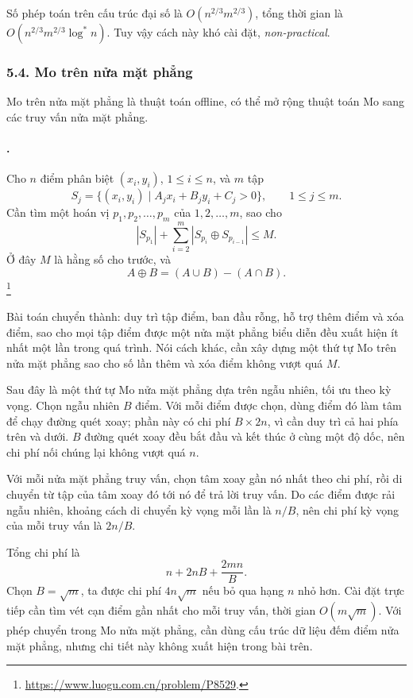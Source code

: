 \documentclass[11pt]{article}
\begin{document}
Số phép toán trên cấu trúc đại số là \(O(n^{2/3}m^{2/3})\), tổng thời gian là
\(O(n^{2/3}m^{2/3}\log^* n)\). Tuy vậy cách này khó cài đặt, \emph{non-practical}.

\subsubsection*{5.4. Mo trên nửa mặt phẳng}

Mo trên nửa mặt phẳng là thuật toán offline, có thể mở rộng thuật toán Mo sang
các truy vấn nửa mặt phẳng.

\paragraph{.}
Cho \(n\) điểm phân biệt \((x_i,y_i)\), \(1\le i\le n\), và \(m\) tập
\[
  S_j=\{(x_i,y_i)\mid A_jx_i+B_jy_i+C_j>0\},\qquad 1\le j\le m.
\]
Cần tìm một hoán vị \(p_1,p_2,\ldots,p_m\) của \(1,2,\ldots,m\), sao cho
\[
  |S_{p_1}|+\sum_{i=2}^{m}|S_{p_i}\oplus S_{p_{i-1}}|\le M.
\]
Ở đây \(M\) là hằng số cho trước, và
\[
  A\oplus B=(A\cup B)-(A\cap B).
\]
\footnote{\url{https://www.luogu.com.cn/problem/P8529}.}

Bài toán chuyển thành: duy trì tập điểm, ban đầu rỗng, hỗ trợ thêm điểm và xóa
điểm, sao cho mọi tập điểm được một nửa mặt phẳng biểu diễn đều xuất hiện ít
nhất một lần trong quá trình. Nói cách khác, cần xây dựng một thứ tự Mo trên
nửa mặt phẳng sao cho số lần thêm và xóa điểm không vượt quá \(M\).

Sau đây là một thứ tự Mo nửa mặt phẳng dựa trên ngẫu nhiên, tối ưu theo kỳ
vọng. Chọn ngẫu nhiên \(B\) điểm. Với mỗi điểm được chọn, dùng điểm đó làm tâm
để chạy đường quét xoay; phần này có chi phí \(B\times 2n\), vì cần duy trì cả
hai phía trên và dưới. \(B\) đường quét xoay đều bắt đầu và kết thúc ở cùng một
độ dốc, nên chi phí nối chúng lại không vượt quá \(n\).

Với mỗi nửa mặt phẳng truy vấn, chọn tâm xoay gần nó nhất theo chi phí, rồi di
chuyển từ tập của tâm xoay đó tới nó để trả lời truy vấn. Do các điểm được rải
ngẫu nhiên, khoảng cách di chuyển kỳ vọng mỗi lần là \(n/B\), nên chi phí kỳ
vọng của mỗi truy vấn là \(2n/B\).

Tổng chi phí là
\[
  n+2nB+\frac{2mn}{B}.
\]
Chọn \(B=\sqrt m\), ta được chi phí \(4n\sqrt m\) nếu bỏ qua hạng \(n\) nhỏ
hơn. Cài đặt trực tiếp cần tìm vét cạn điểm gần nhất cho mỗi truy vấn, thời
gian \(O(m\sqrt m)\). Với phép chuyển trong Mo nửa mặt phẳng, cần dùng cấu trúc
dữ liệu đếm điểm nửa mặt phẳng, nhưng chi tiết này không xuất hiện trong bài
trên.
\end{document}
